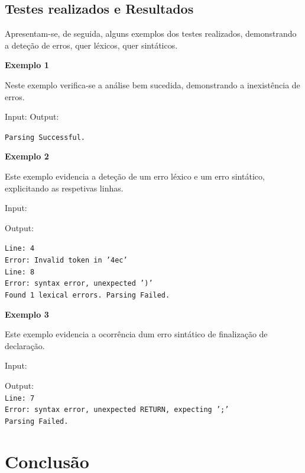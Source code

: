 \documentclass{report}
\begin{document}
\newpage
\section{Testes realizados e Resultados}
Apresentam-se, de seguida, alguns exemplos dos testes realizados, demonstrando a deteção de erros, quer léxicos, quer sintáticos.

\noindent \textbf{Exemplo 1}

Neste exemplo verifica-se a análise bem sucedida, demonstrando a inexistência de erros.

\noindent Input:
Output:

\noindent \texttt{Parsing Successful.}

\newpage

\noindent \textbf{Exemplo 2}

Este exemplo evidencia a deteção de um erro léxico e um erro sintático, explicitando as respetivas linhas.

\noindent Input:

\begin{linenumbers}
\end{linenumbers}

\noindent Output:

\noindent \texttt{Line: 4\\Error: Invalid token in '4ec'\\
Line: 8\\Error: syntax error, unexpected ')'\\
Found 1 lexical errors. Parsing Failed.}

\noindent \textbf{Exemplo 3}

Este exemplo evidencia a ocorrência dum erro sintático de finalização de declaração.

\noindent Input:

\resetlinenumber
\begin{linenumbers}
\end{linenumbers}

\noindent Output: \\
\noindent \texttt{Line: 7\\ Error: syntax error, unexpected RETURN, expecting ';'\\Parsing Failed.}

\chapter{Conclusão}
\end{document}
